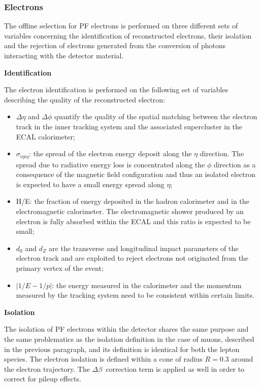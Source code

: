 \subsubsection{Electrons}

The offline selection for PF electrons is performed on three 
different sets of variables concerning the identification of reconstructed 
electrons, their isolation and the rejection of electrons generated from 
the conversion of photons interacting with the detector material.

\smallskip

\textbf{Identification}

The electron identification is performed on the following set of variables 
describing the quality of the reconstructed electron:
\begin{itemize}
  \item $\Delta\eta$ and $\Delta\phi$ quantify the quality of the spatial matching between
    the electron track in the inner tracking system and the associated supercluster
    in the ECAL calorimeter;
  \item $\sigma_{i\eta i\eta}$: the spread of the electron energy deposit along the 
    $\eta$ direction. The spread due to radiative energy loss is concentrated along the 
    $\phi$ direction as a consequence of the magnetic field configuration and thus an 
    isolated electron is expected to have a small energy spread along $\eta$;
  \item H/E: the fraction of energy deposited in the hadron calorimeter and 
    in the electromagnetic calorimeter. The electromagnetic shower produced by an 
    electron is fully absorbed within the ECAL and this ratio is expected to be small;
  \item $d_{0}$ and $d_{Z}$ are the transverse and longitudinal impact parameters
    of the electron track and are exploited to reject electrons not originated from 
    the primary vertex of the event;
  \item $|1/E - 1/p|$: the energy measured in the calorimeter and the momentum 
    measured by the tracking system need to be consistent within certain limits.
\end{itemize}

\smallskip

\textbf{Isolation}

The isolation of PF electrons within the detector shares the same purpose and 
the same problematics as the isolation definition in the case of muons, described in the previous 
paragraph, and its definition is identical 
for both the lepton species.
The electron isolation is defined within a cone of radius $R=0.3$ around the electron 
trajectory.
The $\Delta\beta$~correction term is applied as well 
in order to correct for pileup effects.

